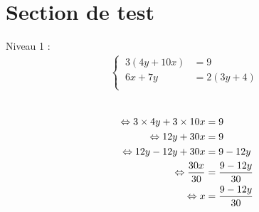 \documentclass{article}%
\begin{document}
%
\normalsize%
\fontsize{12}{10}%
\selectfont%
\section*{Section de test}%
\label{sec:Sectiondetest}%
Niveau 1 :%
\begin{align*}%
\begin{cases}%
\  3(4y + 10x) &= 9 \\%
\  6x + 7y &= 2(3y + 4) \\%
\end{cases}%
\\%
\end{align*}%
\ \\%
\vspace{5mm}%
\newline%
\begin{align*}%
\  \Leftrightarrow 3 \times 4y + 3 \times 10x &= 9 \\%
\vspace{5mm}%
\newline%
\  \Leftrightarrow 12y + 30x &= 9 \\%
\vspace{5mm}%
\newline%
\  \Leftrightarrow 12y - 12y + 30x &= 9 - 12y \\%
\vspace{5mm}%
\newline%
\  \Leftrightarrow \frac{30x}{30} &= \frac{9 - 12y}{30} \\%
\vspace{5mm}%
\newline%
\  \Leftrightarrow x &= \frac{9 - 12y}{30} \\%
\vspace{5mm}%
\newline%
\end{align*}%
\\%
\ \\%
\vspace{5mm}%
\newline%
\end{document}
